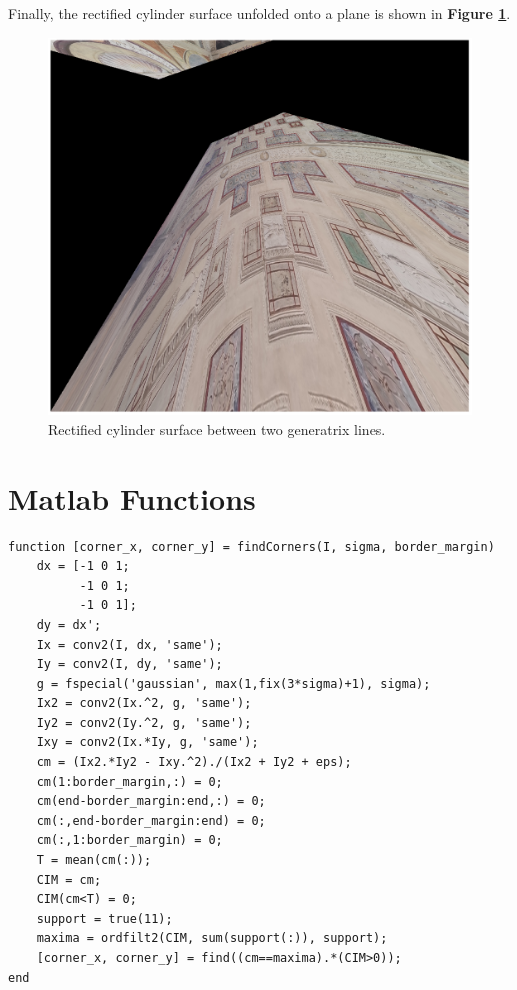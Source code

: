 \documentclass[12pt,a4paper]{article}
\begin{document}
Finally, the rectified cylinder surface unfolded onto a plane is shown in \textbf{Figure \ref{fig:rectified}}.

\begin{figure}[H]
    \centering
    \includegraphics[width=1\textwidth]{Images/PalazzoTe_rectified.png}
    \caption[Rectified cylinder surface between two generatrix lines.]{Rectified cylinder surface between two generatrix lines.}
    \label{fig:rectified}
\end{figure}

\pagebreak

\section*{Matlab Functions}

\begin{verbatim}
function [corner_x, corner_y] = findCorners(I, sigma, border_margin)
    dx = [-1 0 1; 
          -1 0 1; 
          -1 0 1];
    dy = dx';
    Ix = conv2(I, dx, 'same');
    Iy = conv2(I, dy, 'same');
    g = fspecial('gaussian', max(1,fix(3*sigma)+1), sigma);
    Ix2 = conv2(Ix.^2, g, 'same');
    Iy2 = conv2(Iy.^2, g, 'same');
    Ixy = conv2(Ix.*Iy, g, 'same');
    cm = (Ix2.*Iy2 - Ixy.^2)./(Ix2 + Iy2 + eps);
    cm(1:border_margin,:) = 0;
    cm(end-border_margin:end,:) = 0;
    cm(:,end-border_margin:end) = 0;
    cm(:,1:border_margin) = 0;
    T = mean(cm(:));
    CIM = cm;
    CIM(cm<T) = 0;
    support = true(11);
    maxima = ordfilt2(CIM, sum(support(:)), support);
    [corner_x, corner_y] = find((cm==maxima).*(CIM>0));
end
\end{verbatim}
\end{document}
